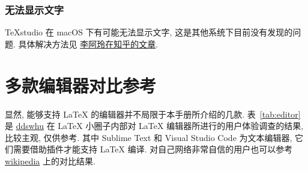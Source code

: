 \subsubsection{无法显示文字}

\TeX studio 在 macOS 下有可能无法显示文字,
这是其他系统下目前没有发现的问题.
具体解决方法见%
\href{https://zhuanlan.zhihu.com/p/80728204}{李阿玲在知乎的文章}.

\section{多款编辑器对比参考}

显然, 能够支持 \LaTeX{} 的编辑器并不局限于本手册所介绍的几款.
表~\ref{tab:editor} 是 \href{https://ddswhu.me/}{ddswhu} 在 \LaTeX{}
小圈子内部对 \LaTeX{} 编辑器所进行的用户体验调查的结果, 比较主观, 仅供参考.
其中 Sublime Text 和 Visual Studio Code 为文本编辑器,
它们需要借助插件才能支持 \LaTeX{} 编译.
对自己网络非常自信的用户也可以参考
\href{https://en.wikipedia.org/wiki/Comparison_of_TeX_editors}{wikipedia}
上的对比结果.

